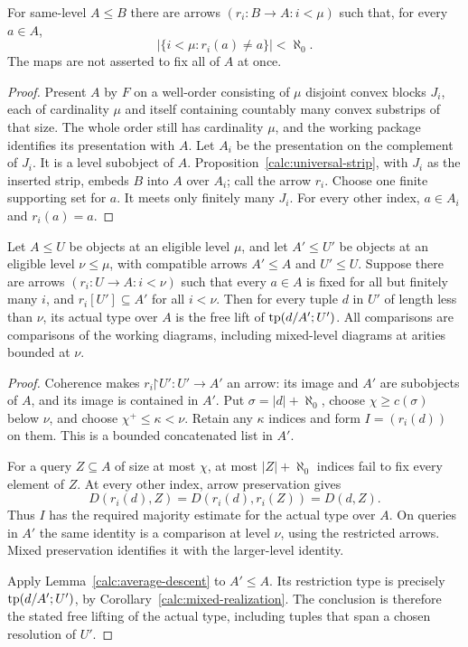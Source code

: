 \begin{corollary}
\label{calc:retractions}
For same-level $A\le B$ there are arrows
$(r_i:B\to A:i<\mu)$ such that, for every $a\in A$,
\[
 \bigl|\{i<\mu:r_i(a)\ne a\}\bigr|<\aleph_0.
\]
The maps are not asserted to fix all of $A$ at once.
\end{corollary}

\begin{proof}
Present $A$ by $F$ on a well-order consisting of $\mu$ disjoint
convex blocks $J_i$, each of cardinality $\mu$ and itself containing
countably many convex substrips of that size.  The whole order still
has cardinality $\mu$, and the working package identifies its
presentation with $A$.  Let $A_i$ be the presentation on the
complement of $J_i$.  It is a level subobject of $A$.
Proposition~\ref{calc:universal-strip}, with $J_i$ as the inserted
strip, embeds $B$ into $A$ over $A_i$; call the arrow $r_i$.
Choose one finite supporting set for $a$.  It meets only finitely
many $J_i$.  For every other index, $a\in A_i$ and $r_i(a)=a$.
\end{proof}

\begin{lemma}
\label{calc:retraction-descent}
Let $A\le U$ be objects at an eligible level $\mu$, and let
$A'\le U'$ be objects at an eligible level $\nu\le\mu$, with
compatible arrows $A'\le A$ and $U'\le U$.  Suppose there are
arrows $(r_i:U\to A:i<\nu)$ such that every $a\in A$ is fixed
for all but finitely many $i$, and $r_i[U']\subseteq A'$ for all
$i<\nu$.  Then for every tuple $d$ in $U'$ of length less than
$\nu$, its actual type over $A$ is the free lift of
$\operatorname{tp}(d/A';U')$.  All comparisons are comparisons of the working
diagrams, including mixed-level diagrams at arities bounded at $\nu$.
\end{lemma}

\begin{proof}
Coherence makes $r_i\mathord\upharpoonright U':U'\to A'$ an
arrow: its image and $A'$ are subobjects of $A$, and its image is
contained in $A'$.  Put $\sigma=|d|+\aleph_0$, choose
$\chi\ge c(\sigma)$ below $\nu$, and choose
$\chi^+\le\kappa<\nu$.  Retain any $\kappa$ indices and form
$I=(r_i(d))$ on them.  This is a bounded concatenated list in $A'$.

For a query $Z\subseteq A$ of size at most $\chi$, at most
$|Z|+\aleph_0$ indices fail to fix every element of $Z$.  At every
other index, arrow preservation gives
\[
 D(r_i(d),Z)=D(r_i(d),r_i(Z))=D(d,Z).
\]
Thus $I$ has the required majority estimate for the actual type
over $A$.  On queries in $A'$ the same identity is a comparison at
level $\nu$, using the restricted arrows.  Mixed preservation
identifies it with the larger-level identity.

Apply Lemma~\ref{calc:average-descent} to $A'\le A$.  Its
restriction type is precisely $\operatorname{tp}(d/A';U')$, by
Corollary~\ref{calc:mixed-realization}.  The conclusion is therefore
the stated free lifting of the actual type, including tuples that
span a chosen resolution of $U'$.
\end{proof}

